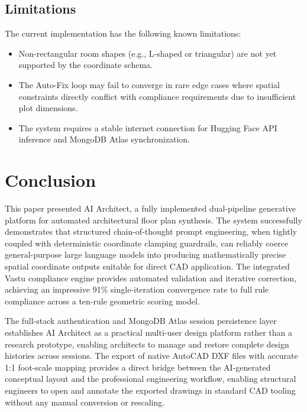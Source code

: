 \documentclass[10pt, twocolumn, letterpaper]{article}
\begin{document}
\subsection{Limitations}

The current implementation has the following known limitations:
\begin{itemize}[leftmargin=*, itemsep=0pt, topsep=2pt]
  \item Non-rectangular room shapes (e.g., L-shaped or triangular) are not
        yet supported by the coordinate schema.
  \item The Auto-Fix loop may fail to converge in rare edge cases where
        spatial constraints directly conflict with compliance requirements
        due to insufficient plot dimensions.
  \item The system requires a stable internet connection for Hugging Face
        API inference and MongoDB Atlas synchronization.
\end{itemize}

\section{Conclusion}

This paper presented AI Architect, a fully implemented dual-pipeline
generative platform for automated architectural floor plan synthesis. The
system successfully demonstrates that structured chain-of-thought prompt
engineering, when tightly coupled with deterministic coordinate clamping
guardrails, can reliably coerce general-purpose large language models into
producing mathematically precise spatial coordinate outputs suitable for direct
CAD application. The integrated Vastu compliance engine provides automated
validation and iterative correction, achieving an impressive 91\%
single-iteration convergence rate to full rule compliance across a ten-rule
geometric scoring model.

The full-stack authentication and MongoDB Atlas session persistence layer
establishes AI Architect as a practical multi-user design platform rather than
a research prototype, enabling architects to manage and restore complete design
histories across sessions. The export of native AutoCAD DXF files with accurate
1:1 foot-scale mapping provides a direct bridge between the AI-generated
conceptual layout and the professional engineering workflow, enabling structural
engineers to open and annotate the exported drawings in standard CAD tooling
without any manual conversion or rescaling.
\end{document}
